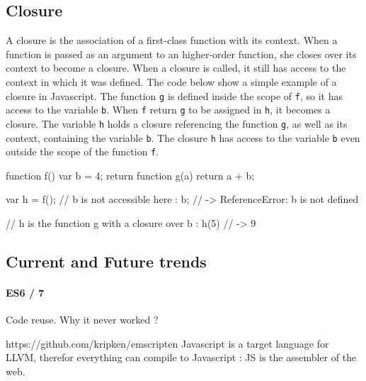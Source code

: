 \subsection{Closure}


A closure is the association of a first-class function with its context.
When a function is passed as an argument to an higher-order function, she closes over its context to become a closure.
When a closure is called, it still has access to the context in which it was defined.
The code below show a simple example of a closure in Javascript.
The function \texttt{g} is defined inside the scope of \texttt{f}, so it has access to the variable \texttt{b}.
When \texttt{f} return \texttt{g} to be assigned in \texttt{h}, it becomes a closure.
The variable \texttt{h} holds a closure referencing the function \texttt{g}, as well as its context, containing the variable \texttt{b}.
The closure \texttt{h} has access to the variable \texttt{b} even outside the scope of the function \texttt{f}.

\begin{code}
  function f() {
    var b = 4;
    return function g(a) {
      return a + b;
    }
  }

  var h = f();
  // b is not accessible here :
  b; // -> ReferenceError: b is not defined

  // h is the function g with a closure over b :
  h(5) // -> 9
\end{code}


\subsection{Current and Future trends}

\paragraph{ES6 / 7}


Code reuse.
Why it never worked ?





https://github.com/kripken/emscripten
Javascript is a target language for LLVM, therefor everything can compile to Javascript : JS is the assembler of the web.


